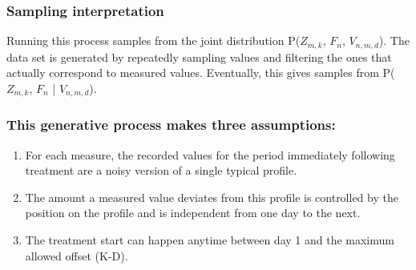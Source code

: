 \subsubsection{Sampling interpretation} 
Running this process samples from the joint distribution P($Z_{m,k}$, $F_n$, $V_{n,m,d}$). The data set is generated by repeatedly sampling values and filtering the ones that actually correspond to measured values. Eventually, this gives samples from P($Z_{m,k}$, $F_n$ | $V_{n,m,d}$).

\subsubsection{This generative process makes three assumptions:}
\begin{enumerate}
    \item For each measure, the recorded values for the period immediately following treatment are a noisy version of a single typical profile.
    \item The amount a measured value deviates from this profile is controlled by the position on the profile and is independent from one day to the next.
    \item The treatment start can happen anytime between day 1 and the maximum allowed offset (K-D).
\end{enumerate}

